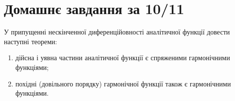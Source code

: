 \setcounter{section}{6}

\section{Домашнє завдання за 10/11}

\begin{problem}[Волковиський, 154]
    У припущенні нескінченної диференційовності аналітичної функції довести наступні теореми:
    \begin{enumerate}
        \item дійсна і уявна частини аналітичної функції є спряженими гармонічними функціями;
        \item похідні (довільного порядку) гармонічної функції також є гармонічними функціями.
    \end{enumerate}
\end{problem}

